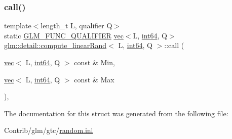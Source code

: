 \subsubsection{\texorpdfstring{call()}{call()}}
{\footnotesize\ttfamily template$<$length\+\_\+t L, qualifier Q$>$ \\
static \mbox{\hyperlink{setup_8hpp_a33fdea6f91c5f834105f7415e2a64407}{G\+L\+M\+\_\+\+F\+U\+N\+C\+\_\+\+Q\+U\+A\+L\+I\+F\+I\+ER}} \mbox{\hyperlink{structglm_1_1vec}{vec}}$<$L, \mbox{\hyperlink{namespaceglm_1_1detail_a5b1c3227ec636c24a0676746381adfc8}{int64}}, Q$>$ \mbox{\hyperlink{structglm_1_1detail_1_1compute__linear_rand}{glm\+::detail\+::compute\+\_\+linear\+Rand}}$<$ L, \mbox{\hyperlink{namespaceglm_1_1detail_a5b1c3227ec636c24a0676746381adfc8}{int64}}, Q $>$\+::call (\begin{DoxyParamCaption}\item[{\mbox{\hyperlink{structglm_1_1vec}{vec}}$<$ L, \mbox{\hyperlink{namespaceglm_1_1detail_a5b1c3227ec636c24a0676746381adfc8}{int64}}, Q $>$ const \&}]{Min,  }\item[{\mbox{\hyperlink{structglm_1_1vec}{vec}}$<$ L, \mbox{\hyperlink{namespaceglm_1_1detail_a5b1c3227ec636c24a0676746381adfc8}{int64}}, Q $>$ const \&}]{Max }\end{DoxyParamCaption})\hspace{0.3cm}{\ttfamily [inline]}, {\ttfamily [static]}}



The documentation for this struct was generated from the following file\+:\begin{DoxyCompactItemize}
\item 
Contrib/glm/gtc/\mbox{\hyperlink{random_8inl}{random.\+inl}}\end{DoxyCompactItemize}
